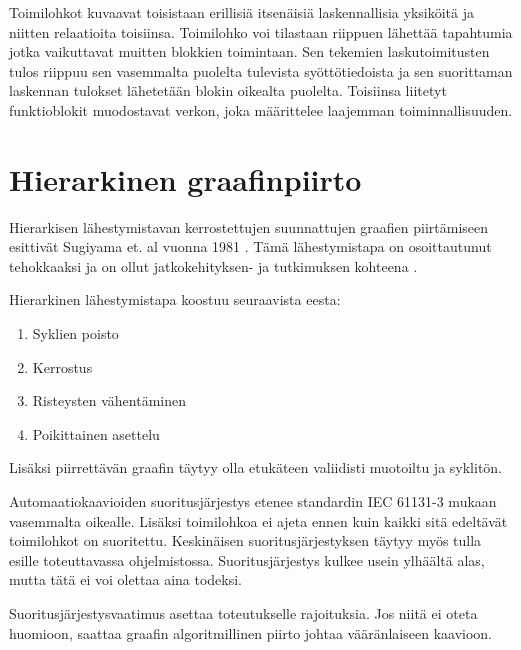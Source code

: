 \documentclass[finnish,12pt]{article}
\begin{document}
Toimilohkot kuvaavat toisistaan erillisiä itsenäisiä laskennallisia yksiköitä
ja niitten relaatioita toisiinsa. Toimilohko voi tilastaan riippuen lähettää
tapahtumia jotka vaikuttavat muitten blokkien toimintaan. Sen tekemien
laskutoimitusten tulos riippuu sen vasemmalta puolelta tulevista
syöttötiedoista ja sen suorittaman laskennan tulokset lähetetään blokin oikealta puolelta.
Toisiinsa liitetyt funktioblokit muodostavat verkon, joka määrittelee laajemman toiminnallisuuden.


	\clearpage
	\section{Hierarkinen graafinpiirto}
	

Hierarkisen lähestymistavan kerrostettujen suunnattujen graafien piirtämiseen
esittivät Sugiyama et. al vuonna 1981 \cite{RefWorks:9}. Tämä lähestymistapa on
osoittautunut tehokkaaksi ja on ollut jatkokehityksen- ja tutkimuksen kohteena
\cite{RefWorks:28}.

Hierarkinen lähestymistapa koostuu seuraavista eesta:
\begin{enumerate}
  \item Syklien poisto
  \item Kerrostus
  \item Risteysten vähentäminen
  \item Poikittainen asettelu
\end{enumerate}

Lisäksi piirrettävän graafin täytyy olla etukäteen valiidisti muotoiltu ja syklitön.

Automaatiokaavioiden suoritusjärjestys etenee standardin IEC 61131-3 mukaan
vasemmalta oikealle. Lisäksi toimilohkoa ei ajeta ennen kuin kaikki sitä edeltävät toimilohkot on suoritettu.
Keskinäisen suoritusjärjestyksen täytyy myös tulla esille toteuttavassa ohjelmistossa.
Suoritusjärjestys kulkee usein ylhäältä alas, mutta tätä ei voi olettaa aina todeksi.

Suoritusjärjestysvaatimus asettaa toteutukselle rajoituksia.
Jos niitä ei oteta huomioon, saattaa graafin algoritmillinen piirto johtaa vääränlaiseen kaavioon.
\end{document}

